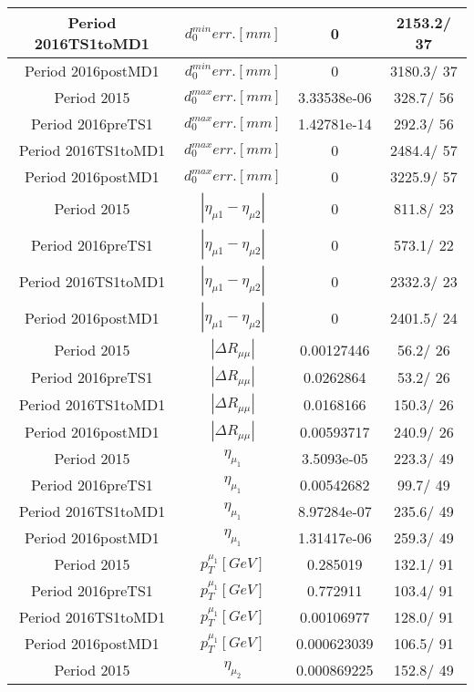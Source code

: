 \documentclass{article}
\begin{document}
\begin{longtable}{c|c|c|c}
\hline
 Period 2016TS1toMD1 & $d_{0}^{min} err. [mm]$ & 0 & 2153.2/ 37\\
\hline
 Period 2016postMD1 & $d_{0}^{min} err. [mm]$ & 0 & 3180.3/ 37\\
\hline
 Period 2015 & $d_{0}^{max} err. [mm]$ & 3.33538e-06 & 328.7/ 56\\
\hline
 Period 2016preTS1 & $d_{0}^{max} err. [mm]$ & 1.42781e-14 & 292.3/ 56\\
\hline
 Period 2016TS1toMD1 & $d_{0}^{max} err. [mm]$ & 0 & 2484.4/ 57\\
\hline
 Period 2016postMD1 & $d_{0}^{max} err. [mm]$ & 0 & 3225.9/ 57\\
\hline
 Period 2015 & $|\eta_{\mu1}-\eta_{\mu2}|$ & 0 & 811.8/ 23\\
\hline
 Period 2016preTS1 & $|\eta_{\mu1}-\eta_{\mu2}|$ & 0 & 573.1/ 22\\
\hline
 Period 2016TS1toMD1 & $|\eta_{\mu1}-\eta_{\mu2}|$ & 0 & 2332.3/ 23\\
\hline
 Period 2016postMD1 & $|\eta_{\mu1}-\eta_{\mu2}|$ & 0 & 2401.5/ 24\\
\hline
 Period 2015 & $|\Delta R_{\mu \mu}|$ & 0.00127446 &  56.2/ 26\\
\hline
 Period 2016preTS1 & $|\Delta R_{\mu \mu}|$ & 0.0262864 &  53.2/ 26\\
\hline
 Period 2016TS1toMD1 & $|\Delta R_{\mu \mu}|$ & 0.0168166 & 150.3/ 26\\
\hline
 Period 2016postMD1 & $|\Delta R_{\mu \mu}|$ & 0.00593717 & 240.9/ 26\\
\hline
 Period 2015 & $\eta_{\mu_{1}}$ & 3.5093e-05 & 223.3/ 49\\
\hline
 Period 2016preTS1 & $\eta_{\mu_{1}}$ & 0.00542682 &  99.7/ 49\\
\hline
 Period 2016TS1toMD1 & $\eta_{\mu_{1}}$ & 8.97284e-07 & 235.6/ 49\\
\hline
 Period 2016postMD1 & $\eta_{\mu_{1}}$ & 1.31417e-06 & 259.3/ 49\\
\hline
 Period 2015 & $p_{T}^{\mu_{1}} [GeV]$ & 0.285019 & 132.1/ 91\\
\hline
 Period 2016preTS1 & $p_{T}^{\mu_{1}} [GeV]$ & 0.772911 & 103.4/ 91\\
\hline
 Period 2016TS1toMD1 & $p_{T}^{\mu_{1}} [GeV]$ & 0.00106977 & 128.0/ 91\\
\hline
 Period 2016postMD1 & $p_{T}^{\mu_{1}} [GeV]$ & 0.000623039 & 106.5/ 91\\
\hline
 Period 2015 & $\eta_{\mu_{2}}$ & 0.000869225 & 152.8/ 49\\

\end{longtable}
\end{document}
